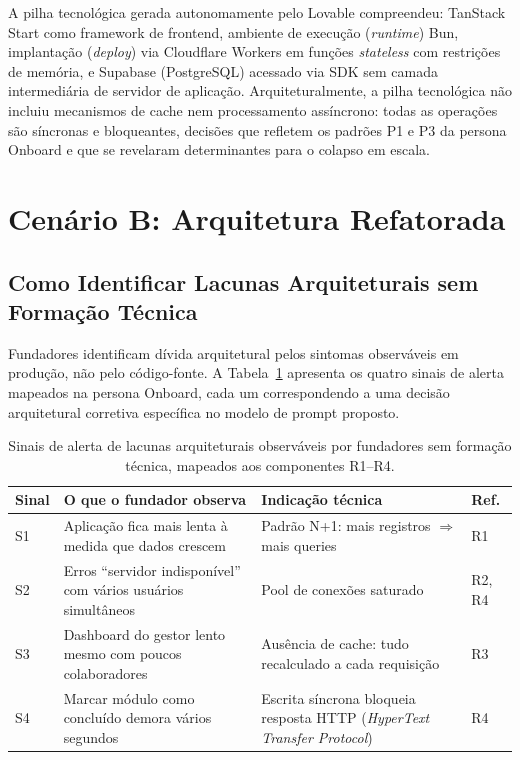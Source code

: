\documentclass[sigconf]{acmart}
\begin{document}
A pilha tecnológica gerada autonomamente pelo Lovable compreendeu: TanStack Start como
framework de frontend, ambiente de execução (\textit{runtime}) Bun, implantação (\textit{deploy}) via Cloudflare Workers em funções
\textit{stateless} com restrições de memória, e Supabase (PostgreSQL) acessado
via SDK sem camada intermediária de servidor de aplicação. Arquiteturalmente, a pilha tecnológica não incluiu
mecanismos de cache nem processamento assíncrono: todas as operações são síncronas
e bloqueantes, decisões que refletem os padrões P1 e P3 da persona Onboard e
que se revelaram determinantes para o colapso em escala.

\section{Cenário B: Arquitetura Refatorada}

\subsection{Como Identificar Lacunas Arquiteturais sem Formação Técnica}

Fundadores identificam dívida arquitetural pelos sintomas observáveis em produção,
não pelo código-fonte. A Tabela~\ref{tab:sinais} apresenta os quatro sinais de
alerta mapeados na persona Onboard, cada um correspondendo a uma decisão
arquitetural corretiva específica no modelo de prompt proposto.

\begin{table}[t]
  \caption{Sinais de alerta de lacunas arquiteturais observáveis por fundadores sem
           formação técnica, mapeados aos componentes R1--R4.}
  \label{tab:sinais}
  \small
  \begin{tabular}{p{0.7cm}p{2.2cm}p{2.2cm}p{1.3cm}}
    \toprule
    \textbf{Sinal} & \textbf{O que o fundador observa} & \textbf{Indicação técnica} & \textbf{Ref.} \\
    \midrule
    S1 & Aplicação fica mais lenta à medida que dados crescem
       & Padrão N+1: mais registros $\Rightarrow$ mais queries & R1 \\
    S2 & Erros ``servidor indisponível'' com vários usuários simultâneos
       & Pool de conexões saturado & R2, R4 \\
    S3 & Dashboard do gestor lento mesmo com poucos colaboradores
       & Ausência de cache: tudo recalculado a cada requisição & R3 \\
    S4 & Marcar módulo como concluído demora vários segundos
       & Escrita síncrona bloqueia resposta HTTP (\textit{HyperText Transfer Protocol}) & R4 \\
    \bottomrule
  \end{tabular}
\end{table}
\end{document}

